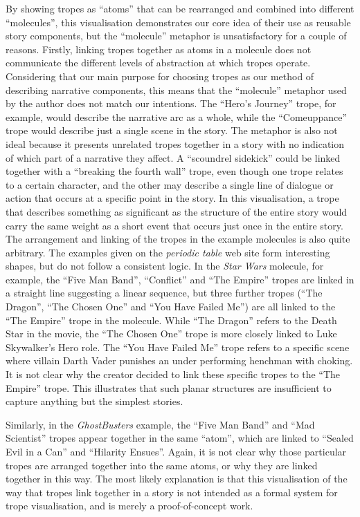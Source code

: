 \documentclass[11pt]{report}
\begin{document}
By showing tropes as ``atoms'' that can be rearranged and combined into
different ``molecules'', this visualisation demonstrates our core idea of their use as reusable
story components, but the ``molecule'' metaphor is unsatisfactory for a couple of
reasons. Firstly, linking tropes together as atoms in a molecule does not
communicate the different levels of abstraction at which tropes operate.
Considering that our main purpose for choosing tropes as our method of
describing narrative components, this means that the ``molecule'' metaphor used
by the author does not match our intentions. The
``Hero's Journey'' trope, for example, would describe the narrative arc as a
whole, while the ``Comeuppance'' trope would describe just a single scene in the
story. The metaphor is also not ideal because it presents unrelated tropes
together in a story with no indication of which part of a narrative they affect.
A ``scoundrel sidekick'' could be linked together with a ``breaking the fourth
wall'' trope, even though one trope relates to a certain character, and the
other may describe a single line of dialogue or action that occurs at a specific
point in the story. In this visualisation, a trope that describes something as
significant as the structure of the entire story would carry the same weight as
a short event that occurs just once in the entire story. The arrangement and linking of the tropes in the example molecules is also
quite arbitrary. The examples given on the \emph{periodic table} web site form
interesting shapes, but do not follow a consistent logic. In the \emph{Star
  Wars} molecule, for example, the ``Five Man Band'', ``Conflict'' and ``The
Empire'' tropes are linked in a straight line suggesting a linear sequence, but
three further tropes (``The Dragon'', ``The Chosen One'' and ``You Have Failed
Me'') are all linked to the ``The Empire'' trope in the molecule. While ``The
Dragon'' refers to the Death Star in the movie, the ``The Chosen One'' trope is
more closely linked to Luke Skywalker's Hero role. The ``You Have Failed Me''
trope refers to a specific scene where villain Darth Vader punishes an
under performing henchman with choking. It is not clear why the creator decided
to link these specific tropes to the ``The Empire''
trope. This illustrates that such planar structures are insufficient to capture
anything but the simplest stories.

Similarly, in the \emph{GhostBusters} example, the ``Five Man Band'' and ``Mad
Scientist'' tropes appear together in the same ``atom'', which are linked to
``Sealed Evil in a Can'' and ``Hilarity Ensues''. Again, it is not clear why
those particular tropes are arranged together into the same atoms, or why they
are linked together in this way. The most likely explanation is that this
visualisation of the way that tropes link together in a story is not intended as
a formal system for trope visualisation, and is merely a proof-of-concept work.
\end{document}

